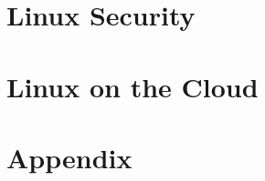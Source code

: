 










\part{Linux Security}




\part{Linux on the Cloud}







\part{Appendix}






\printindex



